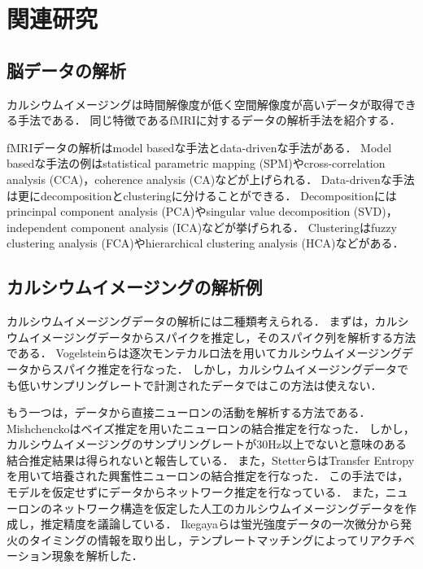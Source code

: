 \section{関連研究}
\subsection{脳データの解析}
カルシウムイメージングは時間解像度が低く空間解像度が高いデータが取得できる手法である．
同じ特徴であるfMRIに対するデータの解析手法を紹介する．

fMRIデータの解析はmodel basedな手法とdata-drivenな手法がある\cite{Li2009}．
Model basedな手法の例はstatistical parametric mapping (SPM)やcross-correlation analysis (CCA)，coherence analysis (CA)などが上げられる．
Data-drivenな手法は更にdecompositionとclusteringに分けることができる．
Decompositionにはprincinpal component analysis (PCA)やsingular value decomposition (SVD)，independent component analysis (ICA)などが挙げられる．
Clusteringはfuzzy clustering analysis (FCA)やhierarchical clustering analysis (HCA)などがある．

\subsection{カルシウムイメージングの解析例}
カルシウムイメージングデータの解析には二種類考えられる．
まずは，カルシウムイメージングデータからスパイクを推定し，そのスパイク列を解析する方法である．
Vogelsteinらは逐次モンテカルロ法を用いてカルシウムイメージングデータからスパイク推定を行なった\cite{Vogelstein2009}．
しかし，カルシウムイメージングデータでも低いサンプリングレートで計測されたデータではこの方法は使えない．

もう一つは，データから直接ニューロンの活動を解析する方法である．
Mishchenckoはベイズ推定を用いたニューロンの結合推定を行なった\cite{Mishchencko2011}．
しかし，カルシウムイメージングのサンプリングレートが30Hz以上でないと意味のある結合推定結果は得られないと報告している．
また，StetterらはTransfer Entropyを用いて培養された興奮性ニューロンの結合推定を行なった\cite{Stetter2012}．
この手法では，モデルを仮定せずにデータからネットワーク推定を行なっている．
また，ニューロンのネットワーク構造を仮定した人工のカルシウムイメージングデータを作成し，推定精度を議論している．
Ikegayaらは蛍光強度データの一次微分から発火のタイミングの情報を取り出し，テンプレートマッチングによってリアクチベーション現象を解析した\cite{Ikegaya2004}．

